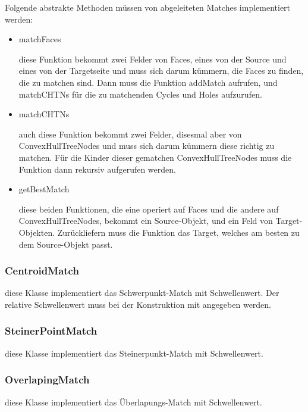 Folgende abstrakte Methoden müssen von abgeleiteten Matches implementiert werden:

\begin{itemize}

\item matchFaces

diese Funktion bekommt zwei Felder von Faces, eines von der Source und eines von der Targetseite und muss sich darum kümmern, die Faces zu finden, die zu matchen sind. Dann muss die Funktion addMatch aufrufen, und matchCHTNs für die zu matchenden Cycles und Holes aufzurufen.

\item matchCHTNs

auch diese Funktion bekommt zwei Felder, disesmal aber von ConvexHullTreeNodes und muss sich darum kümmern diese richtig zu matchen. Für die Kinder dieser gematchen ConvexHullTreeNodes muss die Funktion dann rekursiv aufgerufen werden.

\item getBestMatch

diese beiden Funktionen, die eine operiert auf Faces und die andere auf ConvexHullTreeNodes, bekommt ein Source-Objekt, und ein Feld von Target-Objekten. Zurückliefern muss die Funktion das Target, welches am besten zu dem Source-Objekt passt.

\end{itemize}

\subsubsection{CentroidMatch}

diese Klasse implementiert das Schwerpunkt-Match mit Schwellenwert. Der relative Schwellenwert muss bei der Konstruktion mit angegeben werden.

\subsubsection{SteinerPointMatch}

diese Klasse implementiert das Steinerpunkt-Match mit Schwellenwert.

\subsubsection{OverlapingMatch}

diese Klasse implementiert das Überlapungs-Match mit Schwellenwert.

